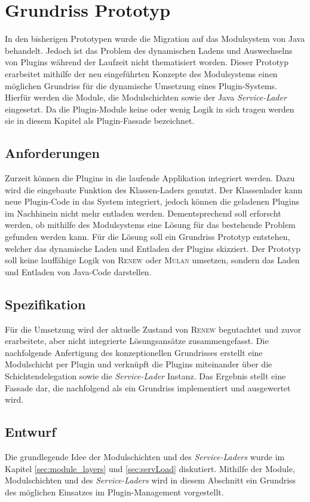 \chapter{Grundriss Prototyp} \label{ch:grRiss}
	In den bisherigen Prototypen wurde die Migration auf das Modulsystem von Java behandelt. Jedoch ist das Problem des dynamischen Ladens und Auswechselns von Plugins während der Laufzeit nicht thematisiert worden. Dieser Prototyp erarbeitet mithilfe der neu eingeführten Konzepte des Modulsystems einen möglichen Grundriss für die dynamische Umsetzung eines Plugin-Systems. Hierfür werden die Module, die Modulschichten sowie der Java \textit{Service-Lader} eingesetzt. Da die Plugin-Module keine oder wenig Logik in sich tragen werden sie in diesem Kapitel als Plugin-Fassade bezeichnet.

\section{Anforderungen} 
	Zurzeit können die Plugins in die laufende Applikation integriert werden. Dazu wird die eingebaute Funktion des Klassen-Laders genutzt. Der Klassenlader kann neue Plugin-Code in das System integriert, jedoch können die geladenen Plugins im Nachhinein nicht mehr entladen werden. Dementsprechend soll erforscht werden, ob mithilfe des Modulsystems eine Lösung für das bestehende Problem gefunden werden kann. Für die Lösung soll ein Grundriss Prototyp entstehen, welcher das dynamische Laden und Entladen der Plugins skizziert. Der Prototyp soll keine lauffähige Logik von \textsc{Renew} oder \textsc{Mulan} umsetzen, sondern das Laden und Entladen von Java-Code darstellen.

\section{Spezifikation} 
	Für die Umsetzung wird der aktuelle Zustand von \textsc{Renew} begutachtet und zuvor erarbeitete, aber nicht integrierte Lösungsansätze zusammengefasst. Die nachfolgende Anfertigung des konzeptionellen Grundrisses erstellt eine Modulschicht per Plugin und verknüpft die Plugins miteinander über die Schichtendelegation sowie die \textit{Service-Lader} Instanz. Das Ergebnis stellt eine Fassade dar, die nachfolgend als ein Grundriss implementiert und ausgewertet wird.

\section{Entwurf} \label{sec:entwurf}
	Die grundlegende Idee der Modulschichten und des \textit{Service-Laders} wurde im Kapitel \ref{sec:module_layers} und \ref{sec:servLoad} diskutiert. Mithilfe der Module, Modulschichten und des \textit{Service-Laders} wird in diesem Abschnitt ein Grundriss des möglichen Einsatzes im Plugin-Management vorgestellt. \bigbreak

